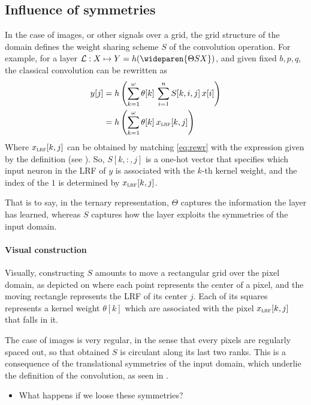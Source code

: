 \subsection{Influence of symmetries}
\label{sec:sym}

In the case of images, or other signals over a grid, the grid structure of the domain defines the weight sharing scheme $S$ of the convolution operation. For example, for a layer $\cl : X  \mapsto Y = h(\wideparen{\Theta S X})$, and given fixed $b,p,q$, the classical convolution can be rewritten as
\begin{align}
y[j] &= h\left(\displaystyle \sum_{k=1}^{\omega} \theta[k] \h{2} \sum_{i=1}^n S[k,i,j] \h{2} x[i] \right)\\
&= h\left(\displaystyle \sum_{k=1}^{\omega} \theta[k] \h{2} x_{\LRF}[k,j] \right) \label{eq:rewr}
\end{align}
Where $x_{\LRF}[k,j]$ can be obtained by matching \eqref{eq:rewr} with the expression given by the definition (see ). So, $S[k,:,j]$ is a one-hot vector that specifies which input neuron in the LRF of $y$ is associated with the $k$-th kernel weight, and the index of the $1$ is determined by $x_{\LRF}[k,j]$.

That is to say, in the ternary representation, $\Theta$ captures the information the layer has learned, whereas $S$ captures how the layer exploits the symmetries of the input domain.

\paragraph{Visual construction}
Visually, constructing $S$ amounts to move a rectangular grid over the pixel domain, as depicted on  where each point represents the center of a pixel, and the moving rectangle represents the LRF of its center $j$. Each of its squares represents a kernel weight $\theta[k]$ which are associated with the pixel $x_{\LRF}[k,j]$ that falls in it.



The case of images is very regular, in the sense that every pixels are regularly spaced out, so that obtained $S$ is circulant along its last two ranks. This is a consequence of the translational symmetries of the input domain, which underlie the definition of the convolution, as seen in .
\begin{itemize}
\item What happens if we loose these symmetries?
\end{itemize}

